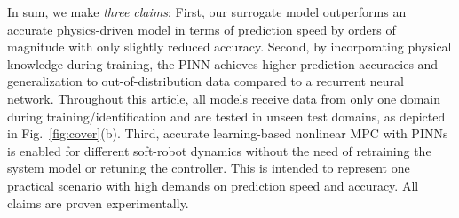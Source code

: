 In sum, we make \textit{three claims}: 
First, our surrogate model outperforms an accurate physics-driven model in terms of prediction speed by orders of magnitude with only slightly reduced accuracy.
Second, by incorporating physical knowledge during training, the PINN achieves higher prediction accuracies and generalization to out-of-distribution data compared to a recurrent neural network.
Throughout this article, all models receive data from only one domain during training/identification and are tested in unseen test domains, as depicted in Fig.~\ref{fig:cover}(b).
Third, accurate learning-based nonlinear MPC with PINNs is enabled for different soft-robot dynamics without the need of retraining the system model or retuning the controller.
This is intended to represent one practical scenario with high demands on prediction speed and accuracy. 
All claims are proven experimentally.